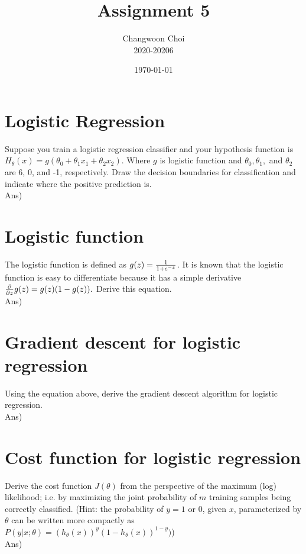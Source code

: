 \documentclass[12pt]{article}%
\begin{document}
\title{Assignment 5}
\author{Changwoon Choi \\ 2020-20206}
\date{\today}
\maketitle

\section{Logistic Regression}
Suppose you train a logistic regression classifier and your hypothesis function is $H_\theta (x) = g(\theta_0 + \theta_1 x_1 + \theta_2 x_2 ).$ Where $g$ is logistic function and $\theta_0 , \theta_1 ,$ and $\theta_2$ are 6, 0, and -1, respectively. Draw the decision boundaries for classification and indicate where the positive prediction is.
\\

Ans) 

\section{Logistic function}
The logistic function is defined as $g(z) = {1 \over 1 + e^{-z}}$. It is known that the logistic function is easy to differentiate because it has a simple derivative $ {\partial \over \partial z}g(z) = g(z)(1 - g(z)).$ Derive this equation.\\

Ans)

\section{Gradient descent for logistic regression}
Using the equation above, derive the gradient descent algorithm for logistic regression.\\

Ans)

\section{Cost function for logistic regression}
Derive the cost function $J(\theta)$ from the perspective of the maximum (log) likelihood; i.e. by maximizing the joint probability of $m$ training samples being correctly classified. (Hint: the probability of $y=1$ or $0$, given $x$, parameterized by $\theta$ can be written more compactly as $P(y | x; \theta) = (h_\theta (x))^y (1 - h_\theta (x))^{1-y} )$)\\

Ans)
\end{document}
